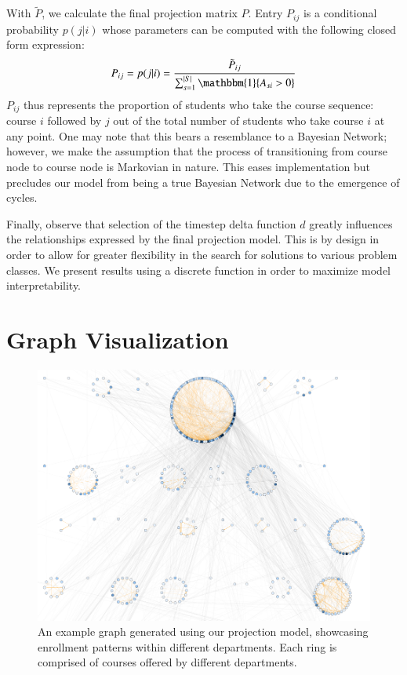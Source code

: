 \documentclass{sigchi}
\begin{document}
With $\tilde{P}$, we calculate the final projection matrix $P$. Entry $P_{ij}$ is a conditional probability $p(j|i)$ whose parameters can be computed with the following closed form expression:
\begin{equation}
    P_{ij} = p(j|i) = \frac{\tilde{P}_{ij}}{\sum_{s=1}^{|S|}\mathbbm{1}\{A_{si} > 0\}}
\end{equation}
$P_{ij}$ thus represents the proportion of students who take the course sequence: course $i$ followed by $j$ out of the total number of students who take course $i$ at any point. One may note that this bears a resemblance to a Bayesian Network; however, we make the assumption that the process of transitioning from course node to course node is Markovian in nature. This eases implementation but precludes our model from being a true Bayesian Network due to the emergence of cycles.

Finally, observe that selection of the timestep delta function $d$ greatly influences the relationships expressed by the final projection model. This is by design in order to allow for greater flexibility in the search for solutions to various problem classes. We present results using a discrete function in order to maximize model interpretability.

\section{Graph Visualization}
\label{sec:visualization}

\begin{figure}
    \centering
    \includegraphics[width=\columnwidth]{final-overview.pdf}
    \caption{An example graph generated using our projection model,
      showcasing enrollment patterns within different departments. Each ring is comprised of courses offered by different departments.}
    \label{fig:overview}
\end{figure}
\end{document}
